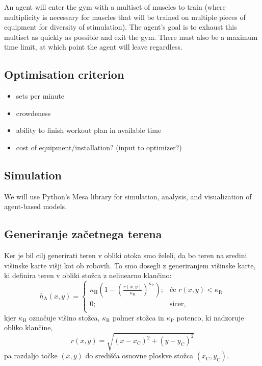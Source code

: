 \documentclass[9pt]{pnas-new}
\newcommand{\const}[1]{{\ensuremath{\kappa_\mathrm{#1}}}}
\begin{document}
An agent will enter the gym with a multiset of muscles to train (where multiplicity is necessary for muscles that will be trained on multiple pieces of equipment for diversity of stimulation). The agent's goal is to exhaust this multiset as quickly as possible and exit the gym. There must also be a maximum time limit, at which point the agent will leave regardless.

\subsection*{Optimisation criterion}

\begin{itemize}
	\item sets per minute
	\item crowdeness
	\item ability to finish workout plan in available time
	\item cost of equipment/installation? (input to optimizer?)
\end{itemize}

\subsection*{Simulation}

We will use Python's Mesa library for simulation, analysis, and visualization of agent-based models.

\subsection*{Generiranje začetnega terena}
Ker je bil cilj generirati teren v obliki otoka smo želeli, da bo teren na sredini višinske karte višji kot ob robovih. To smo dosegli z generiranjem višinske karte, ki definira teren v obliki stožca z nelinearno klančino:
\begin{equation} \label{eq:stozec}
h_\mathrm{A}(x,y) =   
\begin{cases}
\const{H} \left(1-\left(\frac{r(x,y)}{\const{R}}\right)^\const{P}\right); &\text{če } r(x,y) < \const{R}\\
0; &\text{sicer,} \\
\end{cases}
\end{equation}
kjer $\const{H}$ označuje višino stožca, $\const{R}$ polmer stožca in $\const{P}$ potenco, ki nadzoruje obliko klančine,
\begin{equation} \label{eq:dist_to_center}
r(x,y) = \sqrt{(x - x_\mathrm{C})^2 + (y - y_\mathrm{C})^2}
\end{equation}
pa razdaljo točke $(x,y)$ do središča osnovne ploskve stožca $(x_\mathrm{C},y_\mathrm{C})$.
\end{document}
